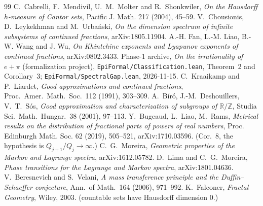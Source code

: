 \documentclass[11pt]{article}
\theoremstyle{definition}
\theoremstyle{remark}
\newcommand{\R}{\mathbb{R}}
\newcommand{\Z}{\mathbb{Z}}
\begin{document}
\begin{thebibliography}{99}
 C.~Cabrelli, F.~Mendivil, U.~M.~Molter and R.~Shonkwiler,
\emph{On the Hausdorff $h$-measure of Cantor sets}, Pacific J. Math. 217
(2004), 45--59.
 V.~Chousionis, D.~Leykekhman and M.~Urba\'nski, \emph{On the dimension spectrum of infinite subsystems of continued fractions}, arXiv:1805.11904.
 A.-H. Fan, L.-M. Liao, B.-W. Wang and J. Wu, \emph{On Khintchine exponents and Lyapunov exponents of continued fractions}, arXiv:0802.3433.
 Phase-1 archive, \emph{On the irrationality of $e+\pi$}
(formalization project), \texttt{EpiFormal/Classification.lean},
Theorem~2 and Corollary~3; \texttt{EpiFormal/SpectralGap.lean}, 2026-11-15.
 C.~Kraaikamp and P.~Liardet, \emph{Good approximations and
continued fractions}, Proc.~Amer.~Math.~Soc.~112 (1991), 303--309.
 A.~B\'ir\'o, J.-M.~Deshouillers, V.~T.~S\'os, \emph{Good
approximation and characterization of subgroups of $\R/\Z$}, Studia Sci.~Math.~Hungar.~38 (2001), 97--113.
 Y.~Bugeaud, L.~Liao, M.~Rams, \emph{Metrical results on the distribution of fractional parts of powers of real numbers}, Proc. Edinburgh Math. Soc. 62 (2019), 505--521, arXiv:1710.03596. (Cor.~8,
the hypothesis is $Q_{j+1}/Q_j\to\infty$.)
 C.~G.~Moreira, \emph{Geometric properties of the Markov and
Lagrange spectra}, arXiv:1612.05782.
 D.~Lima and C.~G.~Moreira, \emph{Phase transitions for
the Lagrange and Markov spectra}, arXiv:1801.04636.
 V.~Beresnevich and S.~Velani, \emph{A mass transference principle
and the Duffin--Schaeffer conjecture}, Ann.~of Math.~164 (2006), 971--992.
 K.~Falconer, \emph{Fractal Geometry}, Wiley, 2003.
(countable sets have Hausdorff dimension $0$.)
\end{thebibliography}
\end{document}
